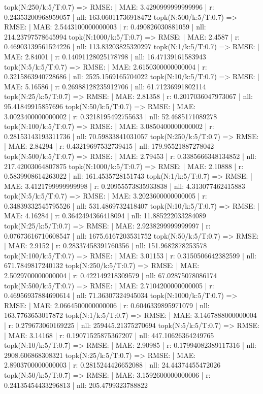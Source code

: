topk(N:250/k:5/T:0.7) => RMSE: | MAE: 3.4290999999999996 | r: 0.24353200968959057 | nll: 163.06011736918472
topk(N:500/k:5/T:0.7) => RMSE: | MAE: 2.5443100000000003 | r: 0.490826030881059 | nll: 214.23797578645994
topk(N:1000/k:5/T:0.7) => RMSE: | MAE: 2.4587 | r: 0.46903139561524226 | nll: 113.83203825320297
topk(N:1/k:5/T:0.7) => RMSE: | MAE: 2.84001 | r: 0.14091128025178798 | nll: 16.47139161583943
topk(N:5/k:5/T:0.7) => RMSE: | MAE: 2.6150300000000004 | r: 0.3215863940728686 | nll: 2525.1569165704022
topk(N:10/k:5/T:0.7) => RMSE: | MAE: 5.16586 | r: 0.26988128235912706 | nll: 61.71236991802114
topk(N:25/k:5/T:0.7) => RMSE: | MAE: 2.81358 | r: 0.2017036047973067 | nll: 95.41849915857696
topk(N:50/k:5/T:0.7) => RMSE: | MAE: 3.0023400000000002 | r: 0.3218195492755633 | nll: 52.4685171089278
topk(N:100/k:5/T:0.7) => RMSE: | MAE: 3.0850400000000002 | r: 0.28153143193311736 | nll: 70.59833841031057
topk(N:250/k:5/T:0.7) => RMSE: | MAE: 2.84294 | r: 0.43219697532739415 | nll: 179.95521887278042
topk(N:500/k:5/T:0.7) => RMSE: | MAE: 2.79453 | r: 0.3385666348134852 | nll: 217.42003064807875
topk(N:1000/k:5/T:0.7) => RMSE: | MAE: 2.10888 | r: 0.5839908614263022 | nll: 161.4535728151743
topk(N:1/k:5/T:0.7) => RMSE: | MAE: 3.4121799999999998 | r: 0.20955573835933838 | nll: 4.313077462415883
topk(N:5/k:5/T:0.7) => RMSE: | MAE: 3.2023600000000005 | r: 0.34839332545795526 | nll: 531.4869732418407
topk(N:10/k:5/T:0.7) => RMSE: | MAE: 4.16284 | r: 0.3642494366418094 | nll: 11.885222033284089
topk(N:25/k:5/T:0.7) => RMSE: | MAE: 2.9238299999999997 | r: 0.07673616710608547 | nll: 1675.6167203531752
topk(N:50/k:5/T:0.7) => RMSE: | MAE: 2.9152 | r: 0.28337458391760356 | nll: 151.9682878253578
topk(N:100/k:5/T:0.7) => RMSE: | MAE: 3.01153 | r: 0.3150506642382599 | nll: 671.7849817240132
topk(N:250/k:5/T:0.7) => RMSE: | MAE: 2.5029700000000004 | r: 0.422149218309579 | nll: 67.02875078086174
topk(N:500/k:5/T:0.7) => RMSE: | MAE: 2.7104200000000005 | r: 0.46956937884690614 | nll: 71.36307324945034
topk(N:1000/k:5/T:0.7) => RMSE: | MAE: 2.0664500000000006 | r: 0.6046339895971079 | nll: 163.7763653017872
topk(N:1/k:5/T:0.7) => RMSE: | MAE: 3.1467888000000004 | r: 0.279673060169225 | nll: 259445.21375270694
topk(N:5/k:5/T:0.7) => RMSE: | MAE: 3.14168 | r: 0.19071525875367207 | nll: 447.10626364249765
topk(N:10/k:5/T:0.7) => RMSE: | MAE: 2.90985 | r: 0.17994082389117316 | nll: 2908.606868308321
topk(N:25/k:5/T:0.7) => RMSE: | MAE: 2.8903700000000003 | r: 0.2815244426652088 | nll: 24.44374455472026
topk(N:50/k:5/T:0.7) => RMSE: | MAE: 3.1592600000000006 | r: 0.24135454433296813 | nll: 205.4799323788822
